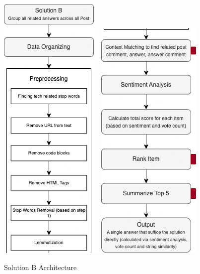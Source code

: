 \pagebreak
\begin{figure}[H]
  \noindent \includegraphics[scale=1]{slice_solution-b_1.png}
  \noindent \includegraphics[scale=1]{slice_solution-b_2.png}
  \caption{Solution B Architecture }\label{solution_b_architecture}
\end{figure}


